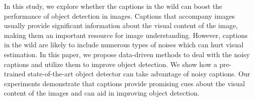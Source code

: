In this study, we explore whether the captions in the wild can boost the performance of object detection in images. Captions that accompany images usually provide significant information about the visual content of the image, making them an important resource for image understanding. However, captions in the wild are likely to include numerous types of noises which can hurt visual estimation. In this paper, we propose data-driven methods to deal with the noisy captions and utilize them to improve object detection. We show how a pre-trained state-of-the-art object detector can take advantage of noisy captions. Our experiments demonstrate that captions provide promising cues about the visual content of the images and can aid in improving object detection.
